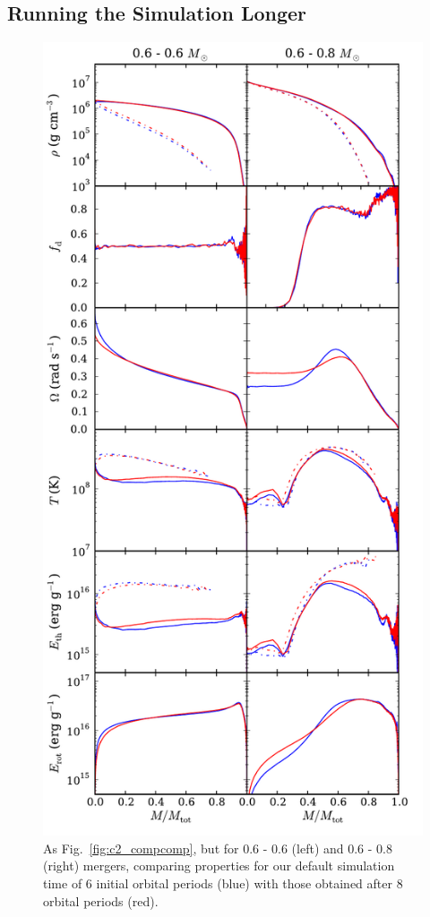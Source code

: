 
\subsection{Running the Simulation Longer}
\label{ssec:c2_runninglonger}

\begin{figure}
\centering
\includegraphics[angle=0,width=0.5\columnwidth]{chapter2_zhu+13/figures/timecomp.pdf}
\caption{As Fig.~\ref{fig:c2_compcomp}, but for 0.6 - 0.6 {\Msun} (left) and 0.6 - 0.8 {\Msun} (right) mergers, comparing properties for our default simulation time of 6 initial orbital periods (blue) with those obtained after 8 orbital periods (red).}
\label{fig:c2_timecomp}
\end{figure}

